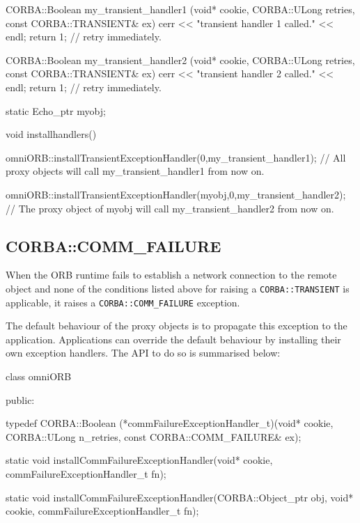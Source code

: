 \documentclass[11pt,twoside,a4paper]{book}
\newcommand{\code}[1]{\texttt{#1}}
\begin{document}
\begin{cxxlisting}
CORBA::Boolean my_transient_handler1 (void* cookie,
                                      CORBA::ULong retries,
                                      const CORBA::TRANSIENT& ex)
{
   cerr << "transient handler 1 called." << endl;
   return 1;           // retry immediately.
}
 
CORBA::Boolean my_transient_handler2 (void* cookie,
                                      CORBA::ULong retries,
                                      const CORBA::TRANSIENT& ex)
{
   cerr << "transient handler 2 called." << endl;
   return 1;           // retry immediately.
}


static Echo_ptr myobj;

void installhandlers()
{
   omniORB::installTransientExceptionHandler(0,my_transient_handler1);
   // All proxy objects will call my_transient_handler1 from now on.

   omniORB::installTransientExceptionHandler(myobj,0,my_transient_handler2);
   // The proxy object of myobj will call my_transient_handler2 from now on.
}
\end{cxxlisting}


\subsection{CORBA::COMM\_FAILURE}

When the ORB runtime fails to establish a network connection to the
remote object and none of the conditions listed above for raising a
\code{CORBA::TRANSIENT} is applicable, it raises a
\code{CORBA::COMM\_FAILURE} exception.

The default behaviour of the proxy objects is to propagate this
exception to the application. Applications can override the default
behaviour by installing their own exception handlers. The API to do so
is summarised below:

\begin{cxxlisting}
class omniORB {
public:

typedef CORBA::Boolean (*commFailureExceptionHandler_t)(void* cookie,
                                                CORBA::ULong n_retries,
                                                const CORBA::COMM_FAILURE& ex);

static void installCommFailureExceptionHandler(void* cookie,
                                             commFailureExceptionHandler_t fn);

static void installCommFailureExceptionHandler(CORBA::Object_ptr obj,
                                             void* cookie,
                                             commFailureExceptionHandler_t
                                             fn);
}
\end{cxxlisting}
\end{document}
